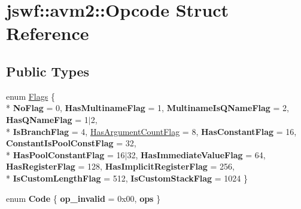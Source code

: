 \hypertarget{structjswf_1_1avm2_1_1_opcode}{\section{jswf\+:\+:avm2\+:\+:Opcode Struct Reference}
\label{structjswf_1_1avm2_1_1_opcode}
}
\subsection*{Public Types}
\begin{DoxyCompactItemize}
\item 
enum \hyperlink{structjswf_1_1avm2_1_1_opcode_a5454d0bfca332ead7135c42d76477e4c}{Flags} \{ \\*
{\bfseries No\+Flag} = 0, 
{\bfseries Has\+Multiname\+Flag} = 1, 
{\bfseries Multiname\+Is\+Q\+Name\+Flag} = 2, 
{\bfseries Has\+Q\+Name\+Flag} = 1$\vert$2, 
\\*
{\bfseries Is\+Branch\+Flag} = 4, 
\hyperlink{structjswf_1_1avm2_1_1_opcode_a5454d0bfca332ead7135c42d76477e4caa309032a1a0b42c33390ffbad794a482}{Has\+Argument\+Count\+Flag} = 8, 
{\bfseries Has\+Constant\+Flag} = 16, 
{\bfseries Constant\+Is\+Pool\+Const\+Flag} = 32, 
\\*
{\bfseries Has\+Pool\+Constant\+Flag} = 16$\vert$32, 
{\bfseries Has\+Immediate\+Value\+Flag} = 64, 
{\bfseries Has\+Register\+Flag} = 128, 
{\bfseries Has\+Implicit\+Register\+Flag} = 256, 
\\*
{\bfseries Is\+Custom\+Length\+Flag} = 512, 
{\bfseries Is\+Custom\+Stack\+Flag} = 1024
 \}
\item 
\hypertarget{structjswf_1_1avm2_1_1_opcode_a8227da5e4379108c48ffc40990d53ad8}{enum {\bfseries Code} \{ {\bfseries op\+\_\+invalid} = 0x00, 
{\bfseries ops}
 \}}\label{structjswf_1_1avm2_1_1_opcode_a8227da5e4379108c48ffc40990d53ad8}

\end{DoxyCompactItemize}
